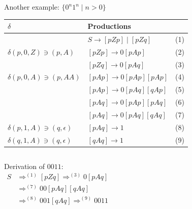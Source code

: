 \documentclass[handout]{beamer}
\begin{document}
\begin{frame}{Another example: $\{0^n1^n\mid n>0\}$}

    \vspace{-6pt}
    {\small    
        \begin{center}
            \begin{tabular}{l l c}
                $\delta$ & Productions & \\\hline
                & $S\rightarrow [pZp]\mid [pZq]$ & (1)\\
                $\delta(p,0,Z)\ni (p,A)$	& $[pZp]\rightarrow 0[pAp] $ & (2)\\
                & $[pZq]\rightarrow 0[pAq] $& (3)\\
                $\delta(p,0,A)\ni (p,AA)$ & $[pAp]\rightarrow 0[pAp][pAp]$ & (4)\\
                & $[pAp]\rightarrow 0[pAq][qAp] $ & (5)\\
                & $[pAq]\rightarrow 0[pAp][pAq] $ & (6)\\
                & $[pAq]\rightarrow 0[pAq][qAq] $ & (7)\\
                $\delta(p,1,A)\ni (q,\epsilon)$ & $[pAq]\rightarrow 1$ & (8)\\			
                $\delta(q,1,A)\ni (q, \epsilon)$ & $[qAq]\rightarrow 1$ & (9)			
            \end{tabular}
        \end{center}
    }

    \bigskip

    \begin{columns}


        Derivation of $0011$:\vspace{-12pt}
        \begin{align*}
            S &\Rightarrow^{(1)} [pZq] \Rightarrow^{(3)} 0[pAq]\\
              &\Rightarrow^{(7)} 00[pAq][qAq]\\
              &\Rightarrow^{(8)} 001[qAq]\Rightarrow^{(9)} 0011   
        \end{align*}



\end{columns}
\end{frame}
\end{document}

